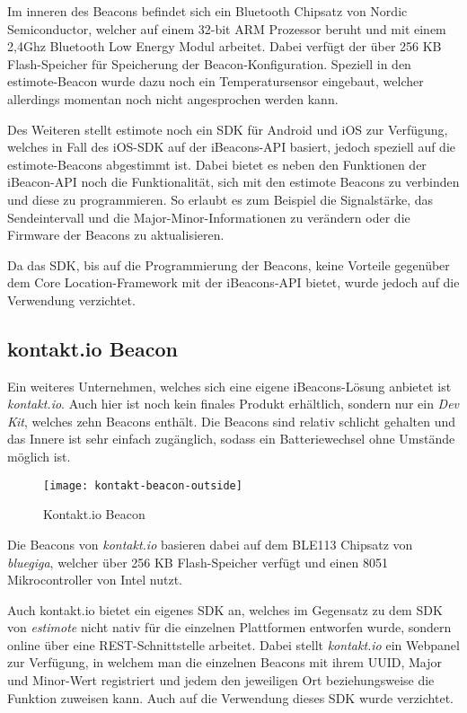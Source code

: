 Im inneren des Beacons befindet sich ein Bluetooth Chipsatz von Nordic Semiconductor, welcher auf einem 32-bit ARM Prozessor beruht und mit einem 2,4Ghz Bluetooth Low Energy Modul arbeitet. Dabei verfügt der über 256 KB Flash-Speicher für Speicherung der Beacon-Konfiguration.
Speziell in den estimote-Beacon wurde dazu noch ein Temperatursensor eingebaut, welcher allerdings momentan noch nicht angesprochen werden kann.

Des Weiteren stellt estimote noch ein SDK für Android und iOS zur Verfügung, welches in Fall des iOS-SDK auf der iBeacons-API basiert, jedoch speziell auf die estimote-Beacons abgestimmt ist. 
Dabei bietet es neben den Funktionen der iBeacon-API noch die Funktionalität, sich mit den estimote Beacons zu verbinden und diese zu programmieren. So erlaubt es zum Beispiel die Signalstärke, das Sendeintervall und die Major-Minor-Informationen zu verändern oder die Firmware der Beacons zu aktualisieren.

Da das SDK, bis auf die Programmierung der Beacons, keine Vorteile gegenüber dem Core Location-Framework mit der iBeacons-API bietet, wurde jedoch auf die Verwendung verzichtet.

\subsection{kontakt.io Beacon}
\label{sec:dataandmeasurement:mobilebeacon:kontaktio}
Ein weiteres Unternehmen, welches sich eine eigene iBeacons-Lösung anbietet ist \emph{kontakt.io}. Auch hier ist noch kein finales Produkt erhältlich, sondern nur ein \emph{Dev Kit}, welches zehn Beacons enthält. 
Die Beacons sind relativ schlicht gehalten und das Innere ist sehr einfach zugänglich, sodass ein Batteriewechsel ohne Umstände möglich ist.


\begin{figure}[htb!]
		\centering
	\texttt{[image: kontakt-beacon-outside]}
	\caption{Kontakt.io Beacon}
	\label{kontakt-beacon-outside}
\end{figure}

Die Beacons von \emph{kontakt.io} basieren dabei auf dem BLE113 Chipsatz von \emph{bluegiga}, welcher über 256 KB Flash-Speicher verfügt und einen 8051 Mikrocontroller von Intel nutzt.


Auch kontakt.io bietet ein eigenes SDK an, welches im Gegensatz zu dem SDK von \emph{estimote} nicht nativ für die einzelnen Plattformen entworfen wurde, sondern online über eine REST-Schnittstelle arbeitet.
Dabei stellt \emph{kontakt.io} ein Webpanel zur Verfügung, in welchem man die einzelnen Beacons mit ihrem UUID, Major und Minor-Wert registriert und jedem den jeweiligen Ort beziehungsweise die Funktion zuweisen kann. 
Auch auf die Verwendung dieses SDK wurde verzichtet.


